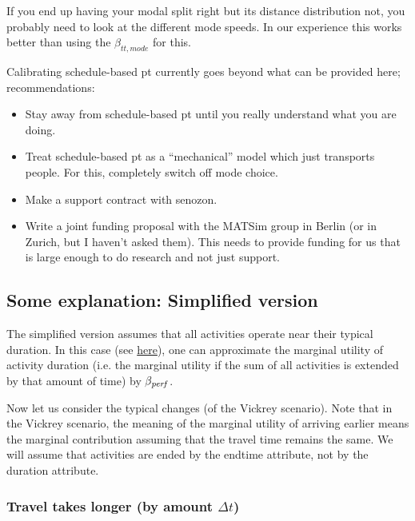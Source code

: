 If you end up having your modal split right but its distance distribution not, you probably need to look at the different mode speeds.  In our experience this works better than using the $\beta_{tt,mode}$ for this.

Calibrating schedule-based pt currently goes beyond what can be provided here; recommendations:
\begin{itemize}

\item Stay away from schedule-based pt until you really understand what you are doing.

\item Treat schedule-based pt as a ``mechanical'' model which just transports people.  For this, completely switch off mode choice.

\item Make a support contract with senozon.

\item Write a joint funding proposal with the MATSim group in Berlin (or in Zurich, but I haven't asked them).  This needs to provide funding for us that is large enough to do research and not just support.

\end{itemize}

\subsection{Some explanation: Simplified version}
\label{sec:some-expl-simpl}

The simplified version assumes that all activities operate near their typical duration. In this case (see \href{http://matsim.org/node/651}{here}),  one can approximate the marginal utility of activity duration (i.e. the  marginal utility if the sum of all activities is extended by that  amount of time) by $\beta_{\it perf}$.

Now let us consider the typical changes (of the Vickrey  scenario). Note that in the Vickrey scenario, the meaning of the  marginal utility of arriving earlier means the marginal contribution  assuming that the travel time remains the same. We will assume  that activities are ended by the endtime attribute, not by the duration  attribute.

\subsubsection{Travel takes longer (by amount $\Delta t$)}

